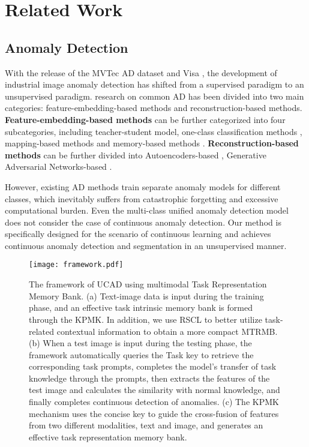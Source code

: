 \section{Related Work}
\subsection{Anomaly Detection}
With the release of the MVTec AD dataset \cite{bergmann2019mvtec} and Visa \cite{zou2022spot}, the development of industrial image anomaly detection has shifted from a supervised paradigm to an unsupervised paradigm. research on common AD \cite{liu2024deep} has been divided into two main categories: feature-embedding-based methods and reconstruction-based methods.
\textbf{Feature-embedding-based methods} can be further categorized into four subcategories, including teacher-student model\cite{bergmann2020uninformed,salehi2021multiresolution,deng2022anomaly,tien2023revisiting,batzner2024efficientad}, one-class classification methods \cite{liu2023simplenet,cao2023anomaly}, mapping-based methods \cite{zhou2024msflow,rudolph2022fully} and memory-based methods \cite{li2022towards,xie2023pushing}. \textbf{Reconstruction-based
methods} can be further divided into Autoencoders-based \cite{schluter2022natural,zavrtanik2021draem}, Generative Adversarial Networks-based \cite{peng2024industrial}.

However, existing AD methods train separate anomaly models for different classes, which inevitably suffers from catastrophic forgetting and excessive computational burden. Even the multi-class unified anomaly detection model \cite{you2022unified,zhao2023omnial,ho2024long} does not consider the case of continuous anomaly detection. Our method is specifically designed for the scenario of continuous learning and achieves continuous anomaly detection and segmentation in an unsupervised manner.

\begin{figure*}[h]
	\centering 
	\texttt{[image: framework.pdf]} 
	\caption{The framework of UCAD using multimodal Task Representation Memory Bank.
    (a) Text-image data is input during the training phase, and an effective task intrinsic memory bank is formed through the KPMK. In addition, we use RSCL to better utilize task-related contextual information to obtain a more compact MTRMB. (b) When a test image is input during the testing phase, the framework automatically queries the Task key to retrieve the corresponding task prompts, completes the model's transfer of task knowledge through the prompts, then extracts the features of the test image and calculates the similarity with normal knowledge, and finally completes continuous detection of anomalies. (c) The KPMK mechanism uses the concise key to guide the cross-fusion of features from two different modalities, text and image, and generates an effective task representation memory bank.}
	\label{MTRMB} 
\end{figure*}

